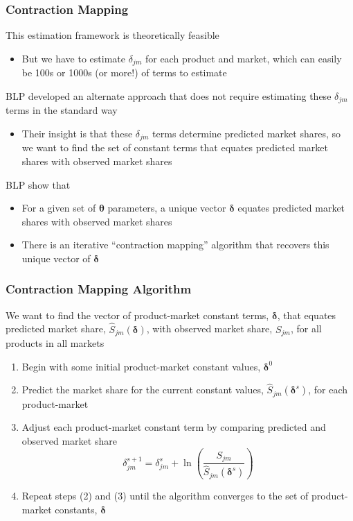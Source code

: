 \documentclass{beamer}
\begin{document}
\begin{frame}\frametitle{Contraction Mapping}
    This estimation framework is theoretically feasible
    \begin{itemize}
        \item But we have to estimate $\delta_{jm}$ for each product and market, which can easily be 100s or 1000s (or more!) of terms to estimate
    \end{itemize}
    \vspace{2ex}
    BLP developed an alternate approach that does not require estimating these $\delta_{jm}$ terms in the standard way
    \begin{itemize}
        \item Their insight is that these $\delta_{jm}$ terms determine predicted market shares, so we want to find the set of constant terms that equates predicted market shares with observed market shares
    \end{itemize}
    \vspace{2ex}
    BLP show that
    \begin{itemize}
        \item For a given set of $\bm{\theta}$ parameters, a unique vector $\bm{\delta}$ equates predicted market shares with observed market shares
        \item There is an iterative ``contraction mapping'' algorithm that recovers this unique vector of $\bm{\delta}$
    \end{itemize}
\end{frame}

\begin{frame}\frametitle{Contraction Mapping Algorithm}
    We want to find the vector of product-market constant terms, $\bm{\delta}$, that equates predicted market share, $\widehat{S}_{jm}(\bm{\delta})$, with observed market share, $S_{jm}$, for all products in all markets
    \begin{enumerate}
        \item Begin with some initial product-market constant values, $\bm{\delta}^0$
        \item Predict the market share for the current constant values, $\widehat{S}_{jm}(\bm{\delta}^s)$, for each product-market
        \item Adjust each product-market constant term by comparing predicted and observed market share
        $$\delta_{jm}^{s+1} = \delta_{jm}^s + \ln \left( \frac{S_{jm}}{\widehat{S}_{jm}(\bm{\delta}^s)} \right)$$
        \item Repeat steps (2) and (3) until the algorithm converges to the set of product-market constants, $\widehat{\bm{\delta}}$
    \end{enumerate}
\end{frame}
\end{document}
